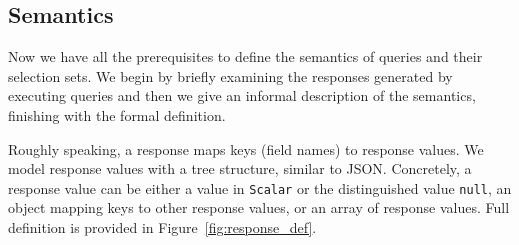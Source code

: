 



 
\subsection{Semantics}\label{subsec:semantics}


Now we have all the prerequisites to define the semantics of \gql queries and their selection sets. We begin by briefly examining the responses generated by executing queries and then we give an informal description of the semantics, finishing with the formal definition. %


Roughly speaking, a \gql response maps keys (field names) to response
values. We model response values with a tree structure, similar to
JSON. Concretely, a response value can be either a value in
\texttt{Scalar} or the distinguished value \texttt{null}, an object
mapping keys to other response values, or an array of response
values. Full definition is provided in Figure~\ref{fig:response_def}.


%





